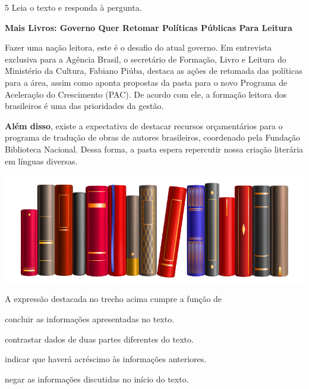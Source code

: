 \num{5} Leia o texto e responda à pergunta.

\begin{myquote}
\textbf{Mais Livros: Governo Quer Retomar Políticas Públicas Para Leitura}

Fazer uma nação leitora, este é o desafio do atual governo. Em
entrevista exclusiva para a Agência Brasil, o secretário de Formação,
Livro e Leitura do Ministério da Cultura, Fabiano Piúba, destaca as
ações de retomada das políticas para a área, assim como aponta propostas
da pasta para o novo Programa de Aceleração do Crescimento (PAC). De
acordo com ele, a formação leitora dos brasileiros é uma das prioridades
da gestão.

\textbf{Além disso}, existe a expectativa de destacar recursos orçamentários
para o programa de tradução de obras de autores brasileiros, coordenado
pela Fundação Biblioteca Nacional. Dessa forma, a pasta espera
repercutir nossa criação literária em línguas diversas.

\begin{center}
\includegraphics[width=\textwidth]{media/image53.png}
\end{center}

\end{myquote}

A expressão destacada no trecho acima cumpre a função de

\begin{escolha}
  \item concluir as informações apresentadas no texto.

  \item contrastar dados de duas partes diferentes do texto.

  \item indicar que haverá acréscimo às informações anteriores.

  \item negar as informações discutidas no início do texto.
\end{escolha}

